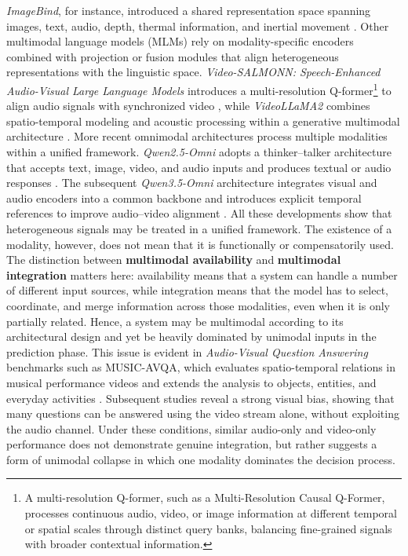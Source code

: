 \textit{ImageBind}, for instance, introduced a shared representation space spanning images, text, audio, depth, thermal information, and inertial movement \cite{girdhar2023imagebind}. Other multimodal language models (\acsp{MLM}) rely on modality-specific encoders combined with projection or fusion modules that align heterogeneous representations with the linguistic space. \textit{Video-SALMONN: Speech-Enhanced Audio-Visual Large Language Models} introduces a multi-resolution Q-former\footnote{A multi-resolution Q-former, such as a Multi-Resolution Causal Q-Former, processes continuous audio, video, or image information at different temporal or spatial scales through distinct query banks, balancing fine-grained signals with broader contextual information.} to align audio signals with synchronized video \cite{sun2024videosalmonn}, while \textit{VideoLLaMA2} combines spatio-temporal modeling and acoustic processing within a generative multimodal architecture \cite{cheng2024videollama2}.
More recent omnimodal architectures process multiple modalities within a unified framework. \textit{Qwen2.5-Omni} adopts a thinker--talker architecture that accepts text, image, video, and audio inputs and produces textual or audio responses \cite{xu2025qwen25omni}. The subsequent \textit{Qwen3.5-Omni} architecture integrates visual and audio encoders into a common backbone and introduces explicit temporal references to improve audio--video alignment \cite{qwen2026qwen35omni}.
All these developments show that heterogeneous signals may be treated in a unified framework. The existence of a modality, however, does not mean that it is functionally or compensatorily used. The distinction between \textbf{multimodal availability} and \textbf{multimodal integration} matters here: availability means that a system can handle a number of different input sources, while integration means that the model has to select, coordinate, and merge information across those modalities, even when it is only partially related. Hence, a system may be multimodal according to its architectural design and yet be heavily dominated by unimodal inputs in the prediction phase.
This issue is evident in \textit{Audio-Visual Question Answering} benchmarks such as MUSIC-\acs{AVQA}, which evaluates spatio-temporal relations in musical performance videos and extends the analysis to objects, entities, and everyday activities \cite{li2022musicavqa}. Subsequent studies reveal a strong visual bias, showing that many questions can be answered using the video stream alone, without exploiting the audio channel. Under these conditions, similar audio-only and video-only performance does not demonstrate genuine integration, but rather suggests a form of unimodal collapse in which one modality dominates the decision process.
